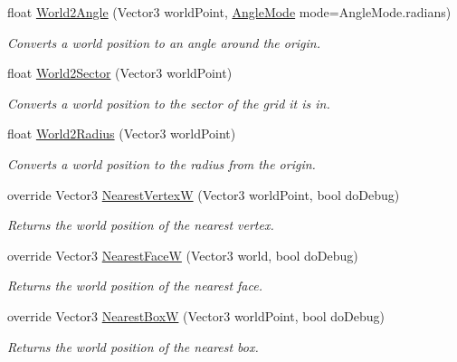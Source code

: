 \begin{DoxyCompactItemize}
float \hyperlink{class_g_f_polar_grid_a4ae9f55612e4c91a5d28b27c924c7432_a4ae9f55612e4c91a5d28b27c924c7432}{World2\+Angle} (Vector3 world\+Point, \hyperlink{namespace_grid_framework_af11322a36c09698c9ad2fa65f85320a9_af11322a36c09698c9ad2fa65f85320a9}{Angle\+Mode} mode=Angle\+Mode.\+radians)
\begin{DoxyCompactList}\small\item\em Converts a world position to an angle around the origin.\end{DoxyCompactList}\item 
float \hyperlink{class_g_f_polar_grid_aa03b782920133982d3ceec6169c2fa08_aa03b782920133982d3ceec6169c2fa08}{World2\+Sector} (Vector3 world\+Point)
\begin{DoxyCompactList}\small\item\em Converts a world position to the sector of the grid it is in.\end{DoxyCompactList}\item 
float \hyperlink{class_g_f_polar_grid_a0c865b865e3dd5a5377f7f24c59ef33d_a0c865b865e3dd5a5377f7f24c59ef33d}{World2\+Radius} (Vector3 world\+Point)
\begin{DoxyCompactList}\small\item\em Converts a world position to the radius from the origin.\end{DoxyCompactList}\item 
override Vector3 \hyperlink{class_g_f_polar_grid_ab0fd04140a3de44e0b407629dcf0e124_ab0fd04140a3de44e0b407629dcf0e124}{Nearest\+Vertex\+W} (Vector3 world\+Point, bool do\+Debug)
\begin{DoxyCompactList}\small\item\em Returns the world position of the nearest vertex.\end{DoxyCompactList}\item 
override Vector3 \hyperlink{class_g_f_polar_grid_a96c9b87b860cfb9099079f6ae1c415d5_a96c9b87b860cfb9099079f6ae1c415d5}{Nearest\+Face\+W} (Vector3 world, bool do\+Debug)
\begin{DoxyCompactList}\small\item\em Returns the world position of the nearest face.\end{DoxyCompactList}\item 
override Vector3 \hyperlink{class_g_f_polar_grid_aa8d60db8cd64b7dbe083d380110ab9d9_aa8d60db8cd64b7dbe083d380110ab9d9}{Nearest\+Box\+W} (Vector3 world\+Point, bool do\+Debug)
\begin{DoxyCompactList}\small\item\em Returns the world position of the nearest box.\end{DoxyCompactList}\item 

\end{DoxyCompactItemize}
